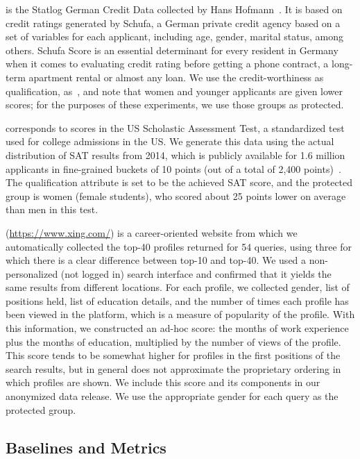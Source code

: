  is the Statlog German Credit Data collected by Hans Hofmann~\cite{lichman_2013_uci}.
%
It is based on credit ratings generated by Schufa, a German private credit agency based on a set of variables for each applicant, including age, gender, marital status, among others. Schufa Score is an essential determinant for every resident in Germany when it comes to evaluating credit rating before getting a phone contract, a long-term apartment rental or almost any loan.
%
We use the credit-worthiness as qualification, as~\cite{yang2016measuring}, and note that women and younger applicants are given lower scores; for the purposes of these experiments, we use those groups as protected.

 corresponds to scores in the US Scholastic Assessment Test, a standardized test used for college admissions in the US.
We generate this data using the actual distribution of SAT results from 2014, which is publicly available for 1.6 million applicants in fine-grained buckets of 10 points (out of a total of 2,400 points)~\cite{sat_2014}.
%
The qualification attribute is set to be the achieved SAT score, and the protected group is women (female students), who scored about 25 points lower on average than men in this test.

 (\url{https://www.xing.com/}) is a career-oriented website from which we automatically collected the top-40 profiles returned for 54 queries, using three for which there is a clear difference between top-10 and top-40.
%
We used a non-personalized (not logged in) search interface and confirmed that it yields the same results from different locations.\label{concept:XING}
%
For each profile, we collected gender, list of positions held, list of education details, and the number of times each profile has been viewed in the platform, which is a measure of popularity of the profile.
%
With this information, we constructed an ad-hoc score: 
the months of work experience %
plus the months of education, %
multiplied by the number of views of the profile.
%
This score tends to be somewhat higher for profiles in the first positions of the search results, but in general does not approximate the proprietary ordering in which profiles are shown. %
%
We include this score and its components in our anonymized data release.
%
We use the appropriate gender for each query as the protected group.

\subsection{Baselines and Metrics}\label{sec:experiments-baselines}

